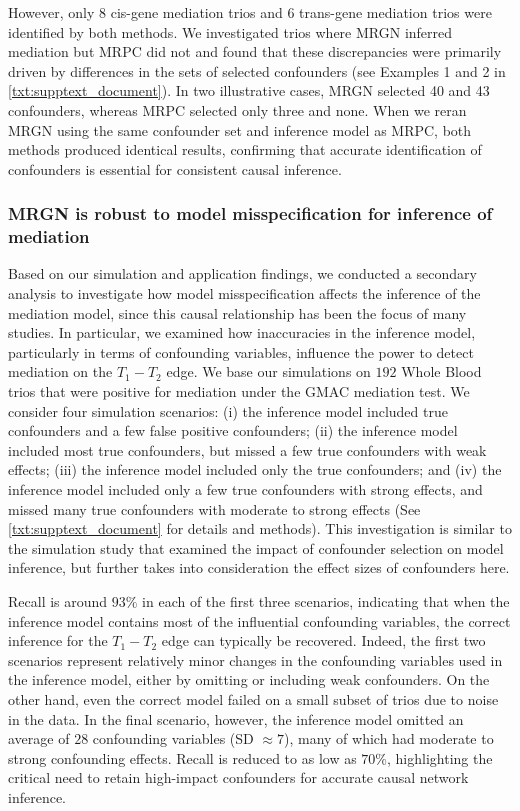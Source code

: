 \documentclass[12pt,letterpaper]{report}
\begin{document}
\begin{doublespace}
However, only $8$ cis-gene mediation trios and $6$ trans-gene mediation trios were identified by both methods.
We investigated trios where MRGN inferred mediation but MRPC did not and found that these discrepancies were primarily driven by differences in the sets of selected confounders (see Examples 1 and 2 in \autoref{txt:supptext_document}). In two illustrative cases, MRGN selected 40 and 43 confounders, whereas MRPC selected only three and none. When we reran MRGN using the same confounder set and inference model as MRPC, both methods produced identical results, confirming that accurate identification of confounders is essential for consistent causal inference.


\subsubsection{MRGN is robust to model misspecification for inference of mediation}

Based on our simulation and application findings, we conducted a secondary analysis to investigate how model misspecification affects the inference of the mediation model, since this causal relationship has been the focus of many studies. In particular, we examined how inaccuracies in the inference model, particularly in terms of confounding variables, influence the power to detect mediation on the $T_1 - T_2$ edge. We base our simulations on $192$ Whole Blood trios that were positive for mediation under the GMAC mediation test. We consider four simulation scenarios: (i) the inference model included true confounders and a few false positive confounders; (ii) the inference model included most true confounders, but missed a few true confounders with weak effects; (iii) the inference model included only the true confounders; and (iv) the inference model included only a few true confounders with strong effects, and missed many true confounders with moderate to strong effects (See \autoref{txt:supptext_document} for details and methods).  This investigation is similar to the simulation study that examined the impact of confounder selection on model inference, but further takes into consideration the effect sizes of confounders here.

Recall is around $93\%$ in each of the first three scenarios, indicating that when the inference model contains most of the influential confounding variables, the correct inference for the $T_1 - T_2$ edge can typically be recovered. Indeed, the first two scenarios represent relatively minor changes in the confounding variables used in the inference model, either by omitting or including weak confounders. On the other hand, even the correct model failed on a small subset of trios due to noise in the data.
In the final scenario, however, the inference model omitted an average of $28$ confounding variables (SD $\approx 7$), many of which had moderate to strong confounding effects. Recall is reduced to as low as $70\%$, highlighting the critical need to retain high-impact confounders for accurate causal network inference.


\end{doublespace}
\end{document}
